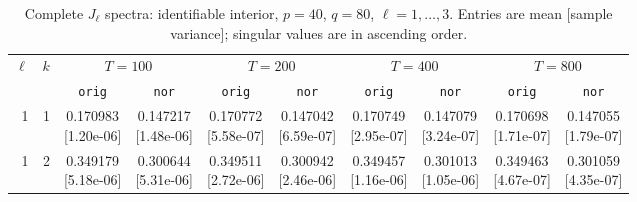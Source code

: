 \documentclass[12pt,letterpaper]{article}
\def\spacingset#1{\renewcommand{\baselinestretch}{#1}\small\normalsize}
\theoremstyle{plain}
\theoremstyle{definition}
\begin{document}
\begin{table}[p]
\begingroup
\spacingset{1.0}
\small\centering
\caption{Complete $J_\ell$ spectra: identifiable interior, $p=40$, $q=80$, $\ell=1,\ldots,3$. Entries are mean [sample variance]; singular values are in ascending order.}
\label{s23:lambda:alltab:spectra:p40q80interior:1-3}
\footnotesize
\setlength{\tabcolsep}{2.2pt}
\renewcommand{\arraystretch}{1.03}
\begin{adjustbox}{max width=\linewidth}
\begin{tabular}{@{}rr*{8}{c}@{}}
\toprule
$\ell$ & $k$ & \multicolumn{2}{c}{$T=100$} & \multicolumn{2}{c}{$T=200$} & \multicolumn{2}{c}{$T=400$} & \multicolumn{2}{c}{$T=800$}\\
\cmidrule(lr){3-4}\cmidrule(lr){5-6}\cmidrule(lr){7-8}\cmidrule(lr){9-10}
 &  & \texttt{orig} & \texttt{nor} & \texttt{orig} & \texttt{nor} & \texttt{orig} & \texttt{nor} & \texttt{orig} & \texttt{nor}\\
\midrule
1 & 1 & \shortstack{0.170983\\[-1pt]{\scriptsize[1.20e-06]}} & \shortstack{0.147217\\[-1pt]{\scriptsize[1.48e-06]}} & \shortstack{0.170772\\[-1pt]{\scriptsize[5.58e-07]}} & \shortstack{0.147042\\[-1pt]{\scriptsize[6.59e-07]}} & \shortstack{0.170749\\[-1pt]{\scriptsize[2.95e-07]}} & \shortstack{0.147079\\[-1pt]{\scriptsize[3.24e-07]}} & \shortstack{0.170698\\[-1pt]{\scriptsize[1.71e-07]}} & \shortstack{0.147055\\[-1pt]{\scriptsize[1.79e-07]}}\\
1 & 2 & \shortstack{0.349179\\[-1pt]{\scriptsize[5.18e-06]}} & \shortstack{0.300644\\[-1pt]{\scriptsize[5.31e-06]}} & \shortstack{0.349511\\[-1pt]{\scriptsize[2.72e-06]}} & \shortstack{0.300942\\[-1pt]{\scriptsize[2.46e-06]}} & \shortstack{0.349457\\[-1pt]{\scriptsize[1.16e-06]}} & \shortstack{0.301013\\[-1pt]{\scriptsize[1.05e-06]}} & \shortstack{0.349463\\[-1pt]{\scriptsize[4.67e-07]}} & \shortstack{0.301059\\[-1pt]{\scriptsize[4.35e-07]}}\\

\end{tabular}
\end{adjustbox}
\end{table}
\end{document}
